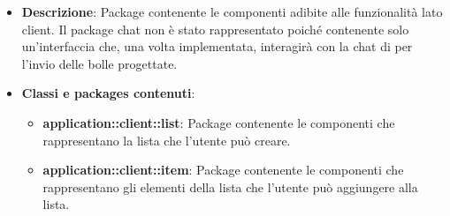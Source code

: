 \begin{itemize}
\item \textbf{Descrizione}: Package contenente le componenti adibite alle funzionalità lato client. Il package chat non è stato rappresentato poiché contenente solo un'interfaccia che, una volta implementata, interagirà con la chat di  per l'invio delle bolle progettate.
\item \textbf{Classi e packages contenuti}:
\begin{itemize}
\item \textbf{application::client::list}: Package contenente le componenti che rappresentano la lista che l'utente può creare.
\item \textbf{application::client::item}: Package contenente le componenti che rappresentano gli elementi della lista che l'utente può aggiungere alla lista.
\end{itemize}
\end{itemize}

